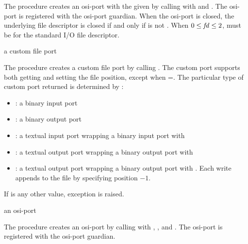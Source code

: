 The  procedure creates an osi-port with the given
 by calling  with  and
. The osi-port is registered with the osi-port
guardian. When the osi-port is closed, the
underlying file descriptor  is closed if and only if
 is not . When $0 \le \var{fd} \le 2$,
 must be  for the standard I/O file descriptor.

\begin{procedure}
\end{procedure}
\returns{} a custom file port

The  procedure creates a custom file port by calling
. The custom
port supports both getting and setting the file position, except when
=. The particular type of custom port returned
is determined by :
\begin{itemize}
  \item {}: a binary input port
  \item {}: a binary output port
  \item {}: a textual input port wrapping a binary input
    port with 
  \item {}: a textual output port wrapping a binary
    output port with 
  \item {}: a textual output port wrapping a binary output
    port with . Each write appends to the file by
    specifying position $-1$.
\end{itemize}

If  is any other value, exception  is raised.

\begin{procedure}
\end{procedure}
\returns{} an osi-port

The  procedure creates an osi-port by calling
 with , , and .
The osi-port is registered with the osi-port guardian.

